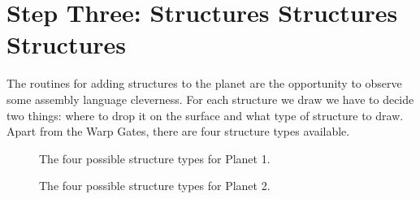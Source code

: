 \section{Step Three: Structures Structures Structures}
The routines for adding structures to the planet are the opportunity to observe some assembly language cleverness.
For each structure we draw we have to decide two things: where to drop it on the surface and what type of structure
to draw. Apart from the Warp Gates, there are four structure types available. 

\begin{figure}[H]
  {
    \setlength{\tabcolsep}{3.0pt}
    \setlength\cmidrulewidth{\heavyrulewidth} %
    \begin{adjustbox}{width=15cm,center}
      \begin{subfigure}{0.3\textwidth}
        
      \end{subfigure}
      \begin{subfigure}{0.3\textwidth}
        
      \end{subfigure}
      \begin{subfigure}{0.3\textwidth}
        
      \end{subfigure}
      \begin{subfigure}{0.3\textwidth}
        
      \end{subfigure}
    \end{adjustbox}
  }\caption[]{The four possible structure types for Planet 1.}
\end{figure}

\begin{figure}[H]
  {
    \setlength{\tabcolsep}{3.0pt}
    \setlength\cmidrulewidth{\heavyrulewidth} %
    \begin{adjustbox}{width=15cm,center}
      \begin{subfigure}{0.3\textwidth}
        
      \end{subfigure}
      \begin{subfigure}{0.3\textwidth}
        
      \end{subfigure}
      \begin{subfigure}{0.3\textwidth}
        
      \end{subfigure}
      \begin{subfigure}{0.3\textwidth}
        
      \end{subfigure}
    \end{adjustbox}
  }\caption[]{The four possible structure types for Planet 2.}
\end{figure}

